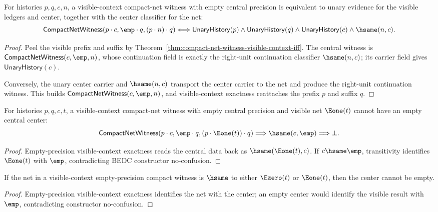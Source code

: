 \begin{theorem}
\label{thm:compact-net-witness-empty-precision-visible-context-iff}
For histories $p,q,c,n$, a visible-context compact-net witness with empty
central precision is equivalent to unary evidence for the visible ledgers and
center, together with the center classifier for the net:
$$
\mathsf{CompactNetWitness}(p\cdot c,\emp\cdot q,(p\cdot n)\cdot q)
\Longleftrightarrow
\mathsf{UnaryHistory}(p)\wedge
\mathsf{UnaryHistory}(q)\wedge
\mathsf{UnaryHistory}(c)\wedge
\hsame(n,c).
$$
\end{theorem}
\begin{proof}
Peel the visible prefix and suffix by
Theorem~\ref{thm:compact-net-witness-visible-context-iff}. The central witness
is $\mathsf{CompactNetWitness}(c,\emp,n)$, whose continuation field is exactly
the right-unit continuation classifier $\hsame(n,c)$; its carrier field gives
$\mathsf{UnaryHistory}(c)$.

Conversely, the unary center carrier and $\hsame(n,c)$ transport the center
carrier to the net and produce the right-unit continuation witness. This builds
$\mathsf{CompactNetWitness}(c,\emp,n)$, and visible-context exactness reattaches
the prefix $p$ and suffix $q$.
\end{proof}

\begin{theorem}
\label{thm:compact-net-witness-visible-context-e1-result-empty-center-absurd}
For histories $p,q,c,t$, a visible-context compact-net witness with empty
central precision and visible net $\Eone(t)$ cannot have an empty central
center:
$$
\mathsf{CompactNetWitness}(p\cdot c,\emp\cdot q,(p\cdot \Eone(t))\cdot q)
\Longrightarrow \hsame(c,\emp)\Longrightarrow\bot.
$$
\end{theorem}
\begin{proof}
Empty-precision visible-context exactness reads the central data back as
$\hsame(\Eone(t),c)$. If $c\hsame\emp$, transitivity identifies $\Eone(t)$
with $\emp$, contradicting BEDC constructor no-confusion.
\end{proof}

\begin{theorem}
\label{thm:compact-net-witness-visible-context-visible-result-empty-center-absurd}
If the net in a visible-context empty-precision compact witness is $\hsame$ to either $\Ezero(t)$ or $\Eone(t)$, then the center cannot be empty.
\end{theorem}
\begin{proof}
Empty-precision visible-context exactness identifies the net with the center; an empty center would identify the visible result with $\emp$, contradicting constructor no-confusion.
\end{proof}

